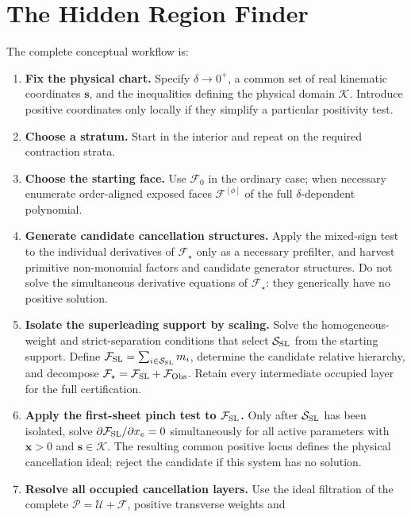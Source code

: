 \documentclass[a4paper,11pt]{article}
\newcommand{\x}{\boldsymbol{x}}
\newcommand{\s}{\boldsymbol{s}}
\newcommand{\K}{\mathcal K}
\newcommand{\FSL}{\mathcal F_{\rm SL}}
\newcommand{\SSL}{\mathcal S_{\rm SL}}
\newcommand{\FObs}{\mathcal F_{\rm Obs}}
\begin{document}
\section{The Hidden Region Finder}
\label{sec:workflow}

The complete conceptual workflow is:
\begin{enumerate}[label=\textbf{\arabic*.},leftmargin=*]
\item \textbf{Fix the physical chart.}
      Specify \(\delta\to0^+\), a common set of real kinematic coordinates
      \(\s\), and the inequalities defining the physical domain \(\K\).
      Introduce positive coordinates only locally if they simplify a
      particular positivity test.
\item \textbf{Choose a stratum.}
      Start in the interior and repeat on the required contraction strata.
\item \textbf{Choose the starting face.}
      Use \(\mathcal F_0\) in the ordinary case; when necessary enumerate
      order-aligned exposed faces \(\mathcal F^{[\phi]}\) of the full
      \(\delta\)-dependent polynomial.
\item \textbf{Generate candidate cancellation structures.}
      Apply the mixed-sign test to the individual derivatives of
      \(\mathcal F_\star\) only as a necessary prefilter, and harvest
      primitive non-monomial factors and candidate generator structures.
      Do not solve the simultaneous derivative equations of
      \(\mathcal F_\star\): they generically have no positive solution.
\item \textbf{Isolate the superleading support by scaling.}
      Solve the homogeneous-weight and strict-separation conditions that
      select \(\SSL\) from the starting support.  Define
      \(\FSL=\sum_{i\in\SSL}m_i\), determine the candidate relative
      hierarchy, and decompose
      \(\mathcal F_\star=\FSL+\FObs\).  Retain every intermediate occupied
      layer for the full certification.
\item \textbf{Apply the first-sheet pinch test to \(\FSL\).}
      Only after \(\SSL\) has been isolated, solve
      \(\partial\FSL/\partial x_e=0\) simultaneously for all active
      parameters with \(\x>0\) and \(\s\in\K\).  The resulting common
      positive locus defines the physical cancellation ideal; reject the
      candidate if this system has no solution.
\item \textbf{Resolve all occupied cancellation layers.}
      Use the ideal filtration of the complete
      \(\mathcal P=\mathcal U+\mathcal F\), positive transverse weights and

\end{enumerate}
\end{document}
